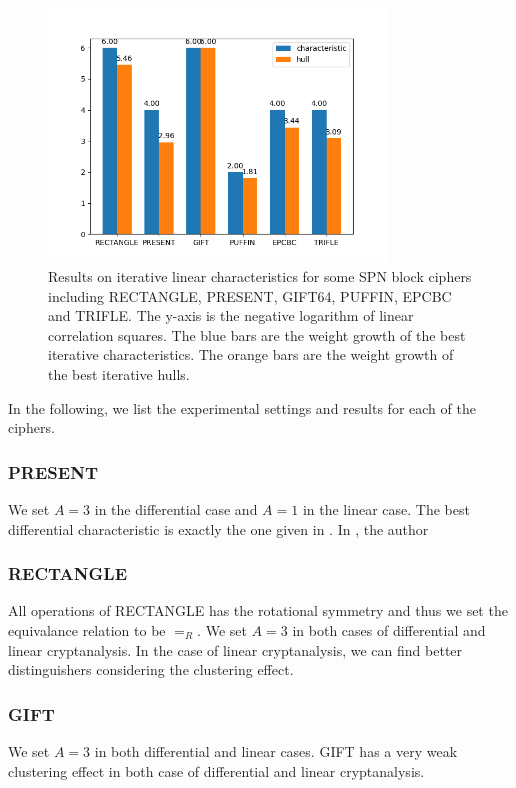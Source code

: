 \begin{figure}\label{fig:bar_lat2}
    \centering
    \caption{Results on iterative linear characteristics for some SPN block ciphers including RECTANGLE, PRESENT, GIFT64, PUFFIN, EPCBC and TRIFLE. The y-axis is the negative logarithm of linear correlation squares. The blue bars are the weight growth of the best iterative characteristics. The orange bars are the weight growth of the best iterative hulls.}
	\includegraphics[width=0.8\textwidth]{fig/bar_lat2.png}
\end{figure}

In the following, we list the experimental settings and results for each of the ciphers. 



\subsubsection{PRESENT \cite{bogdanov2007present}} We set $A=3$ in the differential case and $A=1$ in the linear case. The best differential characteristic is exactly the one given in \cite{wang2008differential}. In \cite{ohkuma2009weak}, the author

\subsubsection{RECTANGLE \cite{zhang2015rectangle}} All operations of RECTANGLE has the rotational symmetry and thus we set the equivalance relation to be $=_R$. We set $A=3$ in both cases of differential and linear cryptanalysis. In the case of linear cryptanalysis, we can find better distinguishers considering the clustering effect. 

\subsubsection{GIFT \cite{banik2017gift}} We set $A=3$ in both differential and linear cases. GIFT has a very weak clustering effect in both case of differential and linear cryptanalysis. 

